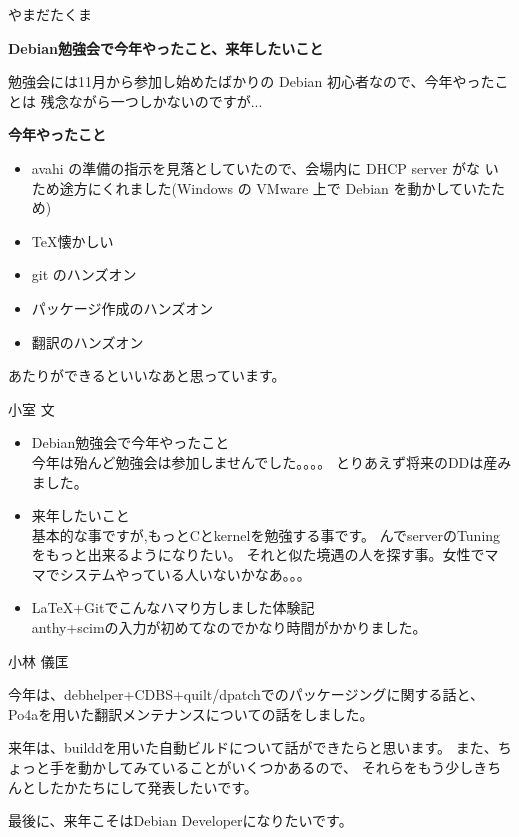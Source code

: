 \begin{prework}{やまだたくま}

\textbf{Debian勉強会で今年やったこと、来年したいこと}

勉強会には11月から参加し始めたばかりの Debian 初心者なので、今年やったことは
残念ながら一つしかないのですが...

\textbf{今年やったこと}

\begin{itemize}
\item avahi の準備の指示を見落としていたので、会場内に DHCP server がな
      いため途方にくれました(Windows の VMware 上で Debian を動かしていたため)
\item \TeX 懐かしい
\end{itemize}


\begin{itemize}
 \item git のハンズオン
 \item パッケージ作成のハンズオン
 \item 翻訳のハンズオン
\end{itemize}
あたりができるといいなあと思っています。

\end{prework}
\begin{prework}{小室 文}
\begin{itemize}
\item Debian勉強会で今年やったこと\\
今年は殆んど勉強会は参加しませんでした。。。。
とりあえず将来のDDは産みました。

\item  来年したいこと\\
基本的な事ですが,もっとCとkernelを勉強する事です。
んでserverのTuningをもっと出来るようになりたい。
それと似た境遇の人を探す事。女性でママでシステムやっている人いないかなあ。。。

 \item \LaTeX{}+Gitでこんなハマり方しました体験記\\
anthy+scimの入力が初めてなのでかなり時間がかかりました。
\end{itemize}

\end{prework}
\begin{prework}{小林 儀匡}

今年は、debhelper+CDBS+quilt/dpatchでのパッケージングに関する話と、
Po4aを用いた翻訳メンテナンスについての話をしました。

来年は、builddを用いた自動ビルドについて話ができたらと思います。
また、ちょっと手を動かしてみていることがいくつかあるので、
それらをもう少しきちんとしたかたちにして発表したいです。

最後に、来年こそはDebian Developerになりたいです。

\end{prework}
